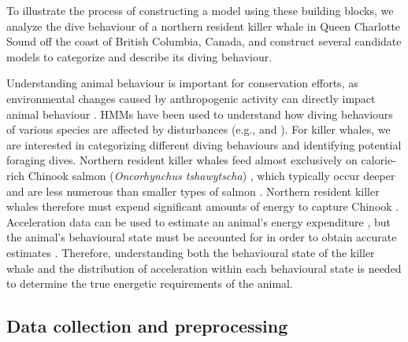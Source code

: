 

To illustrate the process of constructing a model using these building blocks, we analyze the dive behaviour of a northern resident killer whale in Queen Charlotte Sound off the coast of British Columbia, Canada, and construct several candidate models to categorize and describe its diving behaviour.

Understanding animal behaviour is important for conservation efforts, as environmental changes caused by anthropogenic activity can directly impact animal behaviour \citep{Sutherland:1998}. HMMs have been used to understand how diving behaviours of various species are affected by disturbances (e.g., \citet{DeRuiter:2017} and \citet{Isojunno:2017}). For killer whales, we are interested in categorizing different diving behaviours and identifying potential foraging dives. Northern resident killer whales feed almost exclusively on calorie-rich Chinook salmon (\textit{Oncorhynchus tshawytscha}) \citep{Ford:2006}, which typically occur deeper and are less numerous than smaller types of salmon \citep{Ford:2009}. Northern resident killer whales therefore must expend significant amounts of energy to capture Chinook \citep{Williams:2009,Noren:2011,Wright:2017}. 
Acceleration data can be used to estimate an animal's energy expenditure \citep{Green:2009,Wilson:2019}, but the animal's behavioural state must be accounted for in order to obtain accurate estimates \citep{Dot:2016}. Therefore, understanding both the behavioural state of the killer whale and the distribution of acceleration within each behavioural state is needed to determine the true energetic requirements of the animal.

\subsection{Data collection and preprocessing}

